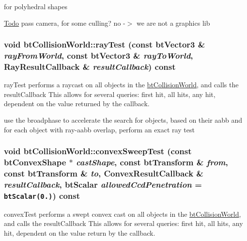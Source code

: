 for polyhedral shapes

\begin{Desc}
\item[\hyperlink{todo__todo000011}{Todo}]pass camera, for some culling? no -$>$ we are not a graphics lib \end{Desc}
\hypertarget{classbt_collision_world_aac6675c8134f6695fecb431c72b0a6a}{
\subsubsection[rayTest]{\setlength{\rightskip}{0pt plus 5cm}void btCollisionWorld::rayTest (const btVector3 \& {\em rayFromWorld}, \/  const btVector3 \& {\em rayToWorld}, \/  {\bf RayResultCallback} \& {\em resultCallback}) const}}
\label{classbt_collision_world_aac6675c8134f6695fecb431c72b0a6a}


rayTest performs a raycast on all objects in the \hyperlink{classbt_collision_world}{btCollisionWorld}, and calls the resultCallback This allows for several queries: first hit, all hits, any hit, dependent on the value returned by the callback. 

use the broadphase to accelerate the search for objects, based on their aabb and for each object with ray-aabb overlap, perform an exact ray test \hypertarget{classbt_collision_world_eeee096b94a5eb31e8c88a29b6c69d37}{
\subsubsection[convexSweepTest]{\setlength{\rightskip}{0pt plus 5cm}void btCollisionWorld::convexSweepTest (const btConvexShape $\ast$ {\em castShape}, \/  const btTransform \& {\em from}, \/  const btTransform \& {\em to}, \/  {\bf ConvexResultCallback} \& {\em resultCallback}, \/  btScalar {\em allowedCcdPenetration} = {\tt btScalar(0.)}) const}}
\label{classbt_collision_world_eeee096b94a5eb31e8c88a29b6c69d37}


convexTest performs a swept convex cast on all objects in the \hyperlink{classbt_collision_world}{btCollisionWorld}, and calls the resultCallback This allows for several queries: first hit, all hits, any hit, dependent on the value return by the callback. 

